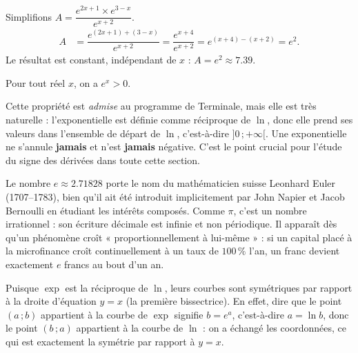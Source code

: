 \documentclass[11pt]{article}
\newcommand{\cle}[1]{{\popxbold\color{popdark}#1}}
\newcounter{popsec}
\newcounter{popsub}
\newcommand{\courssub}[1]{%
  \stepcounter{popsub}%
  \par\vspace{9pt}\noindent{\popxbold\fontsize{11.5}{13}\selectfont\color{popink}{\color{poporange}\thepopsec.\thepopsub}\hspace{6pt}#1}\par\nopagebreak\vspace{4pt}
}
\begin{document}
\begin{exemplebox}
Simplifions $A = \dfrac{e^{2x+1} \times e^{3-x}}{e^{x+2}}$.
\begin{align*}
A &= \dfrac{e^{(2x+1)+(3-x)}}{e^{x+2}} = \dfrac{e^{x+4}}{e^{x+2}} = e^{(x+4)-(x+2)} = e^2.
\end{align*}
Le résultat est constant, indépendant de $x$ : $A = e^2 \approx \num{7,39}$.
\end{exemplebox}

\begin{propriete}
Pour tout réel $x$, on a $\boxed{e^x > 0}$.
\end{propriete}

Cette propriété est \emph{admise} au programme de Terminale, mais elle est très naturelle : l'exponentielle est définie comme réciproque de $\ln$, donc elle prend ses valeurs dans l'ensemble de départ de $\ln$, c'est-à-dire $]0\,;+\infty[$. Une exponentielle ne s'annule \textbf{jamais} et n'est \textbf{jamais} négative. C'est le point crucial pour l'étude du signe des dérivées dans toute cette section.

\begin{savaistu}
Le nombre $e \approx \num{2,71828}$ porte le nom du mathématicien suisse Leonhard Euler (1707--1783), bien qu'il ait été introduit implicitement par John Napier et Jacob Bernoulli en étudiant les intérêts composés. Comme $\pi$, c'est un nombre irrationnel : son écriture décimale est infinie et non périodique. Il apparaît dès qu'un phénomène croît « proportionnellement à lui-même » : si un capital placé à la microfinance croît continuellement à un taux de $100\,\%$ l'an, un franc devient exactement $e$ francs au bout d'un an.
\end{savaistu}

\courssub{Symétrie des courbes de $\ln$ et de $\exp$}

Puisque $\exp$ est la réciproque de $\ln$, leurs courbes sont \cle{symétriques par rapport à la droite d'équation $y = x$} (la première bissectrice). En effet, dire que le point $(a\,;b)$ appartient à la courbe de $\exp$ signifie $b = e^a$, c'est-à-dire $a = \ln b$, donc le point $(b\,;a)$ appartient à la courbe de $\ln$ : on a échangé les coordonnées, ce qui est exactement la symétrie par rapport à $y = x$.
\end{document}
